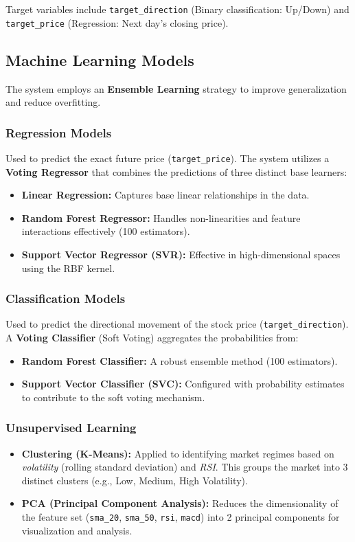 \documentclass[conference]{IEEEtran}
\begin{document}
Target variables include \texttt{target\_direction} (Binary classification: Up/Down) and \texttt{target\_price} (Regression: Next day's closing price).

\subsection{Machine Learning Models}
The system employs an \textbf{Ensemble Learning} strategy to improve generalization and reduce overfitting.

\subsubsection{Regression Models}
Used to predict the exact future price (\texttt{target\_price}). The system utilizes a \textbf{Voting Regressor} that combines the predictions of three distinct base learners:
\begin{itemize}
    \item \textbf{Linear Regression:} Captures base linear relationships in the data.
    \item \textbf{Random Forest Regressor:} Handles non-linearities and feature interactions effectively (100 estimators).
    \item \textbf{Support Vector Regressor (SVR):} Effective in high-dimensional spaces using the RBF kernel.
\end{itemize}

\subsubsection{Classification Models}
Used to predict the directional movement of the stock price (\texttt{target\_direction}). A \textbf{Voting Classifier} (Soft Voting) aggregates the probabilities from:
\begin{itemize}
    \item \textbf{Random Forest Classifier:} A robust ensemble method (100 estimators).
    \item \textbf{Support Vector Classifier (SVC):} Configured with probability estimates to contribute to the soft voting mechanism.
\end{itemize}

\subsubsection{Unsupervised Learning}
\begin{itemize}
    \item \textbf{Clustering (K-Means):} Applied to identifying market regimes based on \textit{volatility} (rolling standard deviation) and \textit{RSI}. This groups the market into 3 distinct clusters (e.g., Low, Medium, High Volatility).
    \item \textbf{PCA (Principal Component Analysis):} Reduces the dimensionality of the feature set (\texttt{sma\_20}, \texttt{sma\_50}, \texttt{rsi}, \texttt{macd}) into 2 principal components for visualization and analysis.
\end{itemize}
\end{document}
